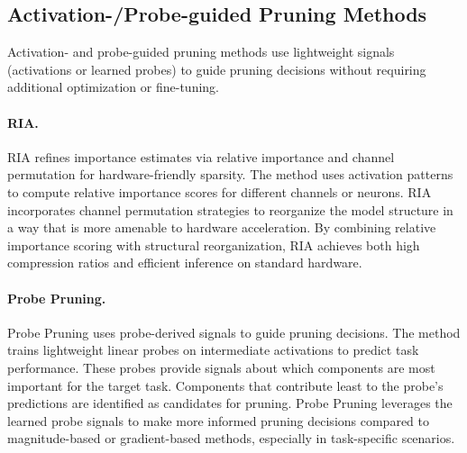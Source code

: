
\subsection{Activation-/Probe-guided Pruning Methods}

Activation- and probe-guided pruning methods use lightweight signals (activations or learned probes) to guide pruning decisions without requiring additional optimization or fine-tuning.

\paragraph{RIA.}
RIA \cite{zhang2024ria} refines importance estimates via relative importance and channel permutation for hardware-friendly sparsity. The method uses activation patterns to compute relative importance scores for different channels or neurons. RIA incorporates channel permutation strategies to reorganize the model structure in a way that is more amenable to hardware acceleration. By combining relative importance scoring with structural reorganization, RIA achieves both high compression ratios and efficient inference on standard hardware.

\paragraph{Probe Pruning.}
Probe Pruning \cite{le2025probe} uses probe-derived signals to guide pruning decisions. The method trains lightweight linear probes on intermediate activations to predict task performance. These probes provide signals about which components are most important for the target task. Components that contribute least to the probe's predictions are identified as candidates for pruning. Probe Pruning leverages the learned probe signals to make more informed pruning decisions compared to magnitude-based or gradient-based methods, especially in task-specific scenarios.


